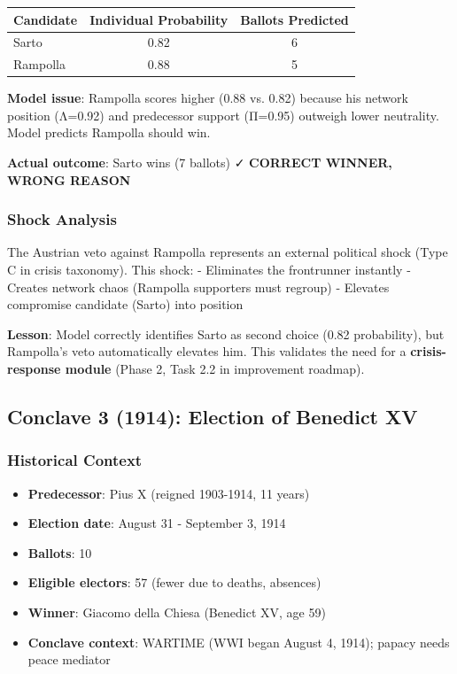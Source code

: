 \documentclass[11pt,a4paper]{article}
\begin{document}
\begin{center}
\begin{tabular}{lcc}
\toprule
\textbf{Candidate} & \textbf{Individual Probability} & \textbf{Ballots Predicted} \\
\midrule
Sarto & 0.82 & 6 \\
Rampolla & 0.88 & 5 \\
\bottomrule
\end{tabular}
\end{center}

\textbf{Model issue}: Rampolla scores higher (0.88 vs. 0.82) because his network position (Λ=0.92) and predecessor support (Π=0.95) outweigh lower neutrality. Model predicts Rampolla should win.

\textbf{Actual outcome}: Sarto wins (7 ballots) ✓ \textbf{CORRECT WINNER, WRONG REASON}

\subsubsection{Shock Analysis}

The Austrian veto against Rampolla represents an external political shock (Type C in crisis taxonomy). This shock:
- Eliminates the frontrunner instantly
- Creates network chaos (Rampolla supporters must regroup)
- Elevates compromise candidate (Sarto) into position

\textbf{Lesson}: Model correctly identifies Sarto as second choice (0.82 probability), but Rampolla's veto automatically elevates him. This validates the need for a \textbf{crisis-response module} (Phase 2, Task 2.2 in improvement roadmap).


\subsection{Conclave 3 (1914): Election of Benedict XV}

\subsubsection{Historical Context}

\begin{itemize}
    \item \textbf{Predecessor}: Pius X (reigned 1903-1914, 11 years)
    \item \textbf{Election date}: August 31 - September 3, 1914
    \item \textbf{Ballots}: 10
    \item \textbf{Eligible electors}: 57 (fewer due to deaths, absences)
    \item \textbf{Winner}: Giacomo della Chiesa (Benedict XV, age 59)
    \item \textbf{Conclave context}: WARTIME (WWI began August 4, 1914); papacy needs peace mediator
\end{itemize}
\end{document}
